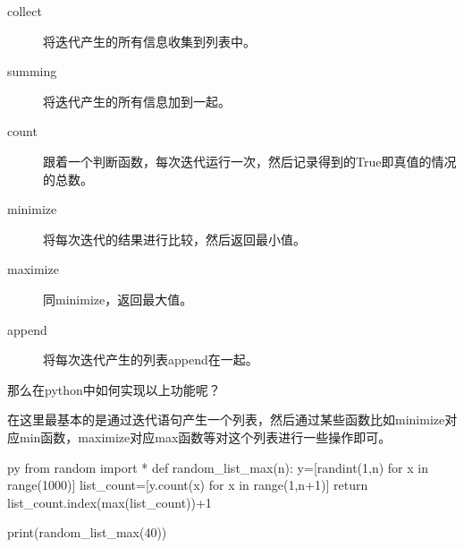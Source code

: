 \documentclass[12pt,oneside]{book}
\begin{document}
\begin{common-format}
\begin{description}
\item[collect] 将迭代产生的所有信息收集到列表中。
\item[summing] 将迭代产生的所有信息加到一起。
\item[count] 跟着一个判断函数，每次迭代运行一次，然后记录得到的True即真值的情况的总数。
\item[minimize] 将每次迭代的结果进行比较，然后返回最小值。
\item[maximize] 同minimize，返回最大值。
\item[append] 将每次迭代产生的列表append在一起。
\end{description}

那么在python中如何实现以上功能呢？

在这里最基本的是通过迭代语句产生一个列表，然后通过某些函数比如minimize对应min函数，maximize对应max函数等对这个列表进行一些操作即可。

\begin{xverbatim}[129]{py}
from random import *
def random_list_max(n):
    y=[randint(1,n) for x in range(1000)]
    list_count=[y.count(x) for x in range(1,n+1)]
    return list_count.index(max(list_count))+1

print(random_list_max(40))
\end{xverbatim}



\end{common-format}
\end{document}
